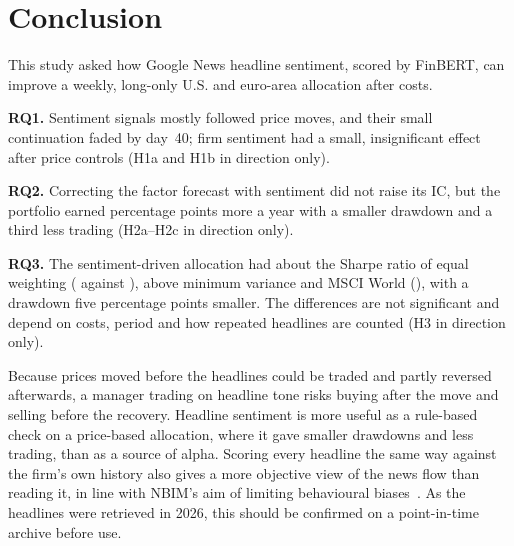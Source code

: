 \section{Conclusion}\label{sec:conclusion}
This study asked how Google News headline sentiment, scored by FinBERT, can improve a weekly, long-only U.S. and euro-area allocation after costs.

\textbf{RQ1.} Sentiment signals mostly followed price moves, and their small continuation faded by day~40; firm sentiment had a small, insignificant effect after price controls (H1a and H1b in direction only).

\textbf{RQ2.} Correcting the factor forecast with sentiment did not raise its IC, but the portfolio earned \BootCombinedPriceCAGR{} percentage points more a year with a smaller drawdown and a third less trading (H2a--H2c in direction only).

\textbf{RQ3.} The sentiment-driven allocation had about the Sharpe ratio of equal weighting (\SentimentSharpe{} against \EWSharpe), above minimum variance and MSCI World (\IndexSharpe), with a drawdown five percentage points smaller. The differences are not significant and depend on costs, period and how repeated headlines are counted (H3 in direction only).

Because prices moved before the headlines could be traded and partly reversed afterwards, a manager trading on headline tone risks buying after the move and selling before the recovery. Headline sentiment is more useful as a rule-based check on a price-based allocation, where it gave smaller drawdowns and less trading, than as a source of alpha. Scoring every headline the same way against the firm's own history also gives a more objective view of the news flow than reading it, in line with NBIM's aim of limiting behavioural biases~\cite{nbim2025}. As the headlines were retrieved in 2026, this should be confirmed on a point-in-time archive before use.

